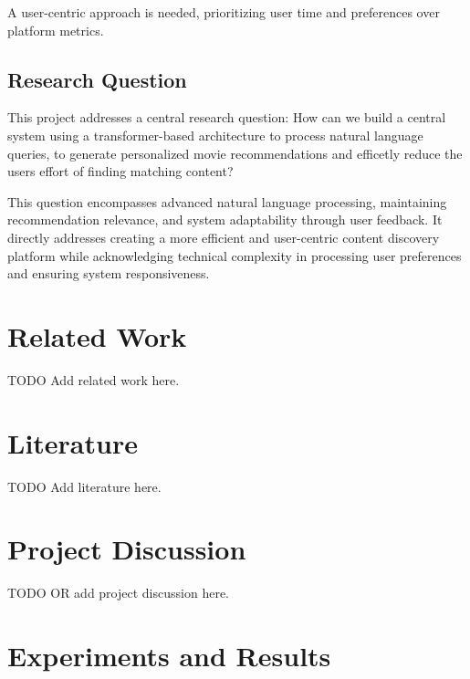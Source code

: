 \documentclass[12pt,a4paper]{article}
\begin{document}
  \noindent A user-centric approach is needed, prioritizing user time and preferences over platform metrics.

  \subsection{Research Question}

  This project addresses a central research question:
  How can we build a central system using a transformer-based architecture to process natural language queries,
  to generate personalized movie recommendations and efficetly reduce the users effort of finding matching content?

  \noindent This question encompasses advanced natural language processing, maintaining recommendation relevance, and system
  adaptability through user feedback. It directly addresses creating a more efficient and user-centric content discovery
  platform while acknowledging technical complexity in processing user preferences and ensuring system responsiveness.

  \section{Related Work}

  TODO Add related work here.

  \section{Literature}

  TODO Add literature here.

  \section{Project Discussion}

  TODO OR add project discussion here.

  \section{Experiments and Results}
\end{document}
